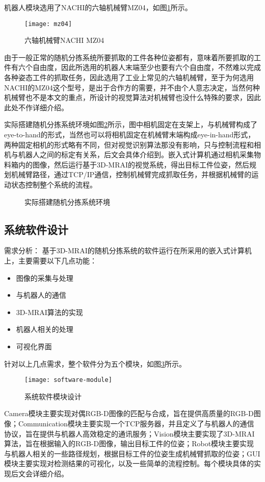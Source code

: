 机器人模块选用了NACHI的六轴机械臂MZ04，如图\ref{fig:mz04}所示。
\begin{figure}[ht]
  \centering
  \texttt{[image: mz04]}
  \caption{六轴机械臂NACHI MZ04}
  \label{fig:mz04}
\end{figure}
由于一般正常的随机分拣系统所要抓取的工件各种位姿都有，意味着所要抓取的工件有六个自由度，因此所选用的机器人末端至少也要有六个自由度，不然难以完成各种姿态工件的抓取任务，因此选用了工业上常见的六轴机械臂，至于为何选用NACHI的MZ04这个型号，是出于合作方的需要，并不由个人意志决定，当然何种机械臂也不是本文的重点，所设计的视觉算法对机械臂也没什么特殊的要求，因此此处不作详细介绍。

实际搭建随机分拣系统环境如图\ref{fig:bin-picking-env}所示，图中相机固定在支架上，与机械臂构成了eye-to-hand的形式，当然也可以将相机固定在机械臂末端构成eye-in-hand形式，两种固定相机的形式略有不同，但对视觉识别算法那没有影响，只与控制流程和相机与机器人之间的标定有关系，后文会具体介绍到。嵌入式计算机通过相机采集物料箱内的图像，然后运行基于3D-MRAI的视觉系统，得出目标工件位姿，然后规划机械臂路径，通过TCP/IP通信，控制机械臂完成抓取任务，并根据机械臂的运动状态控制整个系统的流程。
\begin{figure}[ht]
  \centering
  \caption{实际搭建随机分拣系统环境}
  \label{fig:bin-picking-env}
\end{figure}

\subsection{系统软件设计}
{\kai 需求分析：}
基于3D-MRAI的随机分拣系统的软件运行在所采用的嵌入式计算机上，主要需要以下几点功能：
\begin{itemize}
\item 图像的采集与处理
\item 与机器人的通信
\item 3D-MRAI算法的实现
\item 机器人相关的处理
\item 可视化界面
\end{itemize}
针对以上几点需求，整个软件分为五个模块，如图\ref{fig:software-module}所示。
\begin{figure}[ht]
  \centering
  \texttt{[image: software-module]}
  \caption{系统软件模块设计}
  \label{fig:software-module}
\end{figure}
Camera模块主要实现对偶RGB-D图像的匹配与合成，旨在提供高质量的RGB-D图像；Communication模块主要实现一个TCP服务器，并且定义了与机器人的通信协议，旨在提供与机器人高效稳定的通讯服务；Vision模块主要实现了3D-MRAI算法，旨在根据输入的RGB-D图像，输出目标工件的位姿；Robot模块主要实现与机器人相关的一些路径规划，根据目标工件的位姿生成机械臂抓取的位姿；GUI模块主要实现对检测结果的可视化，以及一些简单的流程控制。每个模块具体的实现后文会详细介绍。

